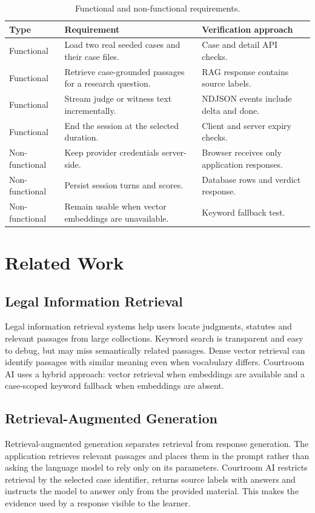 \documentclass[12pt]{article}
\begin{document}
\begin{table}[!htbp]
\centering
\caption{Functional and non-functional requirements.}
\label{tab:requirements}
\begin{tabularx}{0.95\textwidth}{p{}X X}
\toprule
Type & Requirement & Verification approach \\
\midrule
Functional & Load two real seeded cases and their case files. & Case and detail API checks. \\
Functional & Retrieve case-grounded passages for a research question. & RAG response contains source labels. \\
Functional & Stream judge or witness text incrementally. & NDJSON events include delta and done. \\
Functional & End the session at the selected duration. & Client and server expiry checks. \\
Non-functional & Keep provider credentials server-side. & Browser receives only application responses. \\
Non-functional & Persist session turns and scores. & Database rows and verdict response. \\
Non-functional & Remain usable when vector embeddings are unavailable. & Keyword fallback test. \\
\bottomrule
\end{tabularx}
\end{table}

\section{Related Work}
\subsection{Legal Information Retrieval}
Legal information retrieval systems help users locate judgments, statutes and relevant passages from large collections. Keyword search is transparent and easy to debug, but may miss semantically related passages. Dense vector retrieval can identify passages with similar meaning even when vocabulary differs. Courtroom AI uses a hybrid approach: vector retrieval when embeddings are available and a case-scoped keyword fallback when embeddings are absent.

\subsection{Retrieval-Augmented Generation}
Retrieval-augmented generation separates retrieval from response generation. The application retrieves relevant passages and places them in the prompt rather than asking the language model to rely only on its parameters. Courtroom AI restricts retrieval by the selected case identifier, returns source labels with answers and instructs the model to answer only from the provided material. This makes the evidence used by a response visible to the learner.
\end{document}
